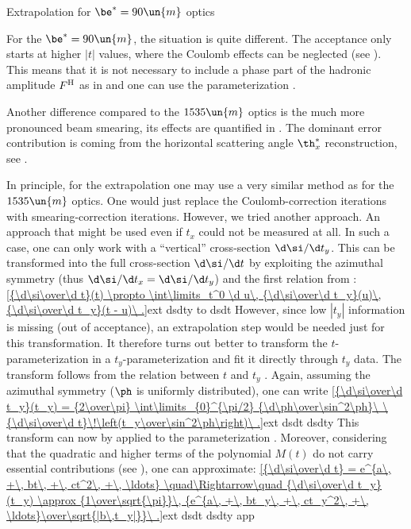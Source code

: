 \caption{Extrapolation for $\be^* = 90\un{m}$ optics}

For the $\be^* = 90\un{m}$, the situation is quite different. The acceptance only starts at higher $|t|$ values, where the Coulomb effects can be neglected (see ). This means that it is not necessary to include a phase part of the hadronic amplitude $F^{\rm H}$ as in  and one can use the parameterization . 

Another difference compared to the $1535\un{m}$ optics is the much more pronounced beam smearing, its effects are quantified in . The dominant error contribution is coming from the horizontal scattering angle $\th_x^*$ reconstruction, see .

In principle, for the extrapolation one may use a very similar method as for the $1535\un{m}$ optics. One would just replace the Coulomb-correction iterations with smearing-correction iterations. However, we tried another approach. An approach that might be used even if $t_x$ could not be measured at all. In such a case, one can only work with a ``vertical'' cross-section $\d\si/\d t_y$. This can be transformed into the full cross-section $\d\si/\d t$ by exploiting the azimuthal symmetry (thus $\d\si/\d t_x = \d\si/\d t_y$) and the first relation from :
\eqref{{\d\si\over\d t}(t) \propto \int\limits_t^0 \d u\, {\d\si\over\d t_y}(u)\, {\d\si\over\d t_y}(t - u)\ .}{ext dsdty to dsdt}
However, since low $|t_y|$ information is missing (out of acceptance), an extrapolation step would be needed just for this transformation. It therefore turns out better to transform the $t$-parameterization  in a $t_y$-parameterization and fit it directly through $t_y$ data. The transform follows from the relation between $t$ and $t_y$ . Again, assuming the azimuthal symmetry ($\ph$ is uniformly distributed), one can write
\eqref{{\d\si\over\d t_y}(t_y) = {2\over\pi} \int\limits_{0}^{\pi/2} {\d\ph\over\sin^2\ph}\ \ {\d\si\over\d t}\!\left(t_y\over\sin^2\ph\right)\ .}{ext dsdt dsdty}
This transform can now by applied to the parameterization . Moreover, considering that the quadratic and higher terms of the polynomial $M(t)$ do not carry essential contributions (see ), one can approximate:
\eqref{{\d\si\over\d t} = e^{a\, +\, bt\, +\, ct^2\, +\, \ldots} \quad\Rightarrow\quad {\d\si\over\d t_y}(t_y) \approx {1\over\sqrt{\pi}}\, {e^{a\, +\, bt_y\, +\, ct_y^2\, +\, \ldots}\over\sqrt{|b\,t_y|}}\ .}{ext dsdt dsdty app}

